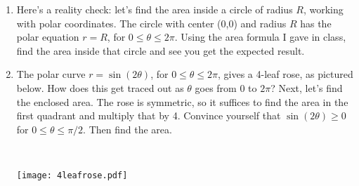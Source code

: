 \documentclass[11pt, oneside]{article}   	%
\begin{document}
\begin{enumerate}
\item Here's a reality check: let's find the area inside a circle of radius $R$, working with polar coordinates. The circle with center (0,0) and radius $R$ has the polar equation $r=R$, for $0  \le \theta \le 2\pi$. Using the area formula I gave in class, find the area inside that circle and see you get the expected result.

\newpage

\item The polar curve $r=\sin(2\theta)$, for $0\le\theta \le 2\pi$, gives a 4-leaf rose, as pictured below.
How does this get traced out as $\theta$ goes from 0 to $2\pi$? Next, let's find the enclosed area. The rose is symmetric, so it suffices to find the area in the first quadrant and multiply that by 4. Convince yourself that $\sin(2\theta) \ge 0$ for $0 \le \theta \le \pi/2.$ Then find the area.

\

\texttt{[image: 4leafrose.pdf]}



\end{enumerate}
\end{document}
